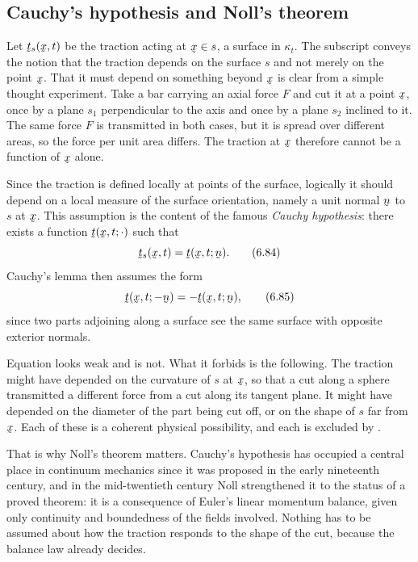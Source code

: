 \subsection{Cauchy's hypothesis and Noll's theorem}\label{sec:ch6noll}

Let $\bt_{s}(\bx,t)$ be the traction acting at $\bx\in s$, a surface in
$\kappa_{t}$. The subscript conveys the notion that the traction
depends on the surface $s$ and not merely on the point $\bx$. That it
must depend on something beyond $\bx$ is clear from a simple thought
experiment. Take a bar carrying an axial force $F$ and cut it at a
point $\bx$, once by a plane $s_{1}$ perpendicular to the axis and once
by a plane $s_{2}$ inclined to it. The same force $F$ is transmitted in
both cases, but it is spread over different areas, so the force per
unit area differs. The traction at $\bx$ therefore cannot be a function
of $\bx$ alone.

Since the traction is defined locally at points of the surface,
logically it should depend on a local measure of the surface
orientation, namely a unit normal $\bn$ to $s$ at $\bx$. This
assumption is the content of the famous \emph{Cauchy hypothesis}: there
exists a function $\bt(\bx,t;\cdot)$ such that
\begin{equation}
   \bt_{s}(\bx,t)=\bt(\bx,t;\bn).
   \tag{6.84}\label{eq:6.84}
\end{equation}
Cauchy's lemma  then assumes the form
\begin{equation}
   \bt(\bx,t;-\bn)=-\bt(\bx,t;\bn),
   \tag{6.85}\label{eq:6.85}
\end{equation}
since two parts adjoining along a surface see the same surface with
opposite exterior normals.

\begin{remark}\label{rem:ch6cauchyhyp}
Equation  looks weak and is not. What it forbids is the
following. The traction might have depended on the
curvature of $s$ at $\bx$, so that a cut along a sphere transmitted a
different force from a cut along its tangent plane. It might have
depended on the diameter of the part being cut off, or on the shape of
$s$ far from $\bx$. Each of these is a coherent physical possibility,
and each is excluded by .

That is why Noll's theorem matters. Cauchy's hypothesis has occupied a
central place in continuum mechanics since it was proposed in the early
nineteenth century, and in the mid-twentieth century Noll strengthened
it to the status of a proved theorem: it is a consequence of Euler's
linear momentum balance, given only continuity and boundedness of the
fields involved. Nothing has to be assumed about how the traction
responds to the shape of the cut, because the balance law already
decides.
\end{remark}

